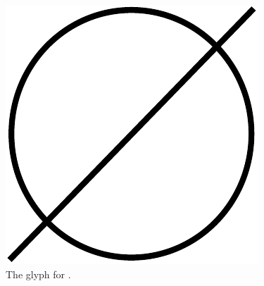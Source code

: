 \begin{figure}[H]
  \centering
  \includegraphics[scale = 0.3]{images/sourceSink}
  \caption{The \ER glyph for .}
  \label{fig:sourceSink}
\end{figure}

\normalcolor

